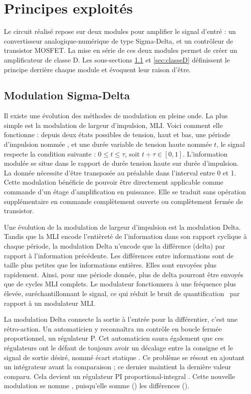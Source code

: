 \documentclass[10pt, oneside, a4paper]{article}
\newcommand{\important}[1]{\textbf{\textsf{\color{gray}{#1}}}}
\begin{document}
\section{Principes exploités}
Le circuit réalisé repose sur deux modules pour amplifier le signal d'entré :
un convertisseur analogique-numérique de type Sigma-Delta, et un contrôleur de transistor MOSFET.
La mise en série de ces deux modules permet de créer un amplificateur de classe D.
Les sous-sections \ref{sec:sigmaDelta} et \ref{sec:classeD} définissent le principe derrière chaque module et évoquent leur raison d'être.


\subsection{Modulation Sigma-Delta}
	\label{sec:sigmaDelta}
Il existe une évolution des méthodes de modulation en pleine onde.
La plus simple est la modulation de largeur d'impulsion, MLI.
Voici comment elle fonctionne : depuis deux états possibles de tension, haut et bas, une période d'impulsion nommée \tau, et une durée variable de tension haute nommée $t$, le signal respecte la condition suivante : $0 \leq t \leq \tau $, soit $t \div \tau \in [0,1]$.
L'information modulée se situe dans le rapport de durée tension haute sur durée d'impulsion.
La donnée nécessite d'être transposée au préalable dans l'interval entre 0 et 1.
Cette modulation bénéficie de pouvoir être directement applicable comme commande d'un étage d'amplification en puissance.
Elle se traduit sans opération supplémentaire en commande complètement ouverte ou complètement fermée de transistor.

Une évolution de la modulation de largeur d'impulsion est la modulation Delta.
Tandis que la MLI encode l'entièreté de l'information dans son rapport cyclique à chaque période, la modulation Delta n'encode que la différence (delta) par rapport à l'information précédente.
Les différences entre informations sont de taille plus petites que les informations entières.
Elles sont envoyées plus rapidement.
Ainsi, pour une période donnée, plus de delta pourront être envoyés que de cycles MLI complets.
Le modulateur fonctionnera à une fréquence plus élevée, suréchantillonnant le signal, ce qui réduit le bruit de quantification~\cite{gray1998quantization} par rapport à un modulateur MLI.

La modulation Delta connecte la sortie à l'entrée pour la différentier, c'est une rétro-action.
Un automaticien y reconnaîtra un contrôle en boucle fermée proportionnel, un régulateur P.
Cet automaticien saura également que ces régulateurs ont le défaut de toujours avoir un décalage entre la consigne et le signal de sortie désiré, nommé \og écart statique \fg{}.
Ce problème se résout en ajoutant un intégrateur avant la comparaison ; ce dernier maintient la dernière valeur comparu.
Cela devient un régulateur PI \og proportional-integral \fg{}.
Cette nouvelle modulation se nomme \important{Sigma-Delta}, puisqu'elle somme (\Sigma) les différences (\Delta).
\end{document}
